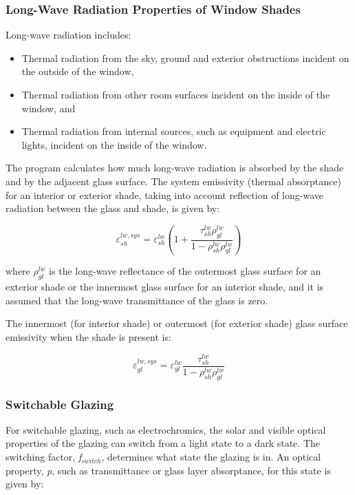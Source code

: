 \subsubsection{Long-Wave Radiation Properties of Window Shades}\label{long-wave-radiation-properties-of-window-shades}

Long-wave radiation includes:

\begin{itemize}
\item Thermal radiation from the sky, ground and exterior obstructions incident on the outside of the window,
\item Thermal radiation from other room surfaces incident on the inside of the window, and
\item Thermal radiation from internal sources, such as equipment and electric lights, incident on the inside of the window.
\end{itemize}

The program calculates how much long-wave radiation is absorbed by the shade and by the adjacent glass surface. The system emissivity (thermal absorptance) for an interior or exterior shade, taking into account reflection of long-wave radiation between the glass and shade, is given by:

\begin{equation}
\varepsilon_{sh}^{lw,sys} = \varepsilon_{sh}^{lw}\left( {1 + \frac{{\tau_{sh}^{lw}\rho_{gl}^{lw}}}{{1 - \rho_{sh}^{lw}\rho_{gl}^{lw}}}} \right)
\end{equation}

where \(\rho_{gl}^{lw}\) is the long-wave reflectance of the outermost glass surface for an exterior shade or the innermost glass surface for an interior shade, and it is assumed that the long-wave transmittance of the glass is zero.

The innermost (for interior shade) or outermost (for exterior shade) glass surface emissivity when the shade is present is:

\begin{equation}
\varepsilon_{gl}^{lw,sys} = \varepsilon_{gl}^{lw}\frac{{\tau_{sh}^{lw}}}{{1 - \rho_{sh}^{lw}\rho_{gl}^{lw}}}
\end{equation}

\subsubsection{Switchable Glazing}\label{switchable-glazing}

For switchable glazing, such as electrochromics, the solar and visible optical properties of the glazing can switch from a light state to a dark state. The switching factor, \emph{f\(_{switch}\)}, determines what state the glazing is in. An optical property, \emph{p}, such as transmittance or glass layer absorptance, for this state is given by:


